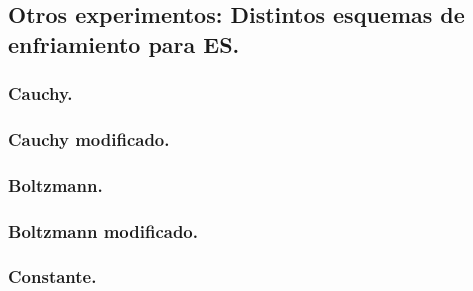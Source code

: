 \documentclass[12pt, spanish]{article}
\begin{document}
\subsection{Otros experimentos: Distintos esquemas de enfriamiento para ES.}

\subsubsection{Cauchy.}

\subsubsection{Cauchy modificado.}

\subsubsection{Boltzmann.}

\subsubsection{Boltzmann modificado.}

\subsubsection{Constante.}
\end{document}
